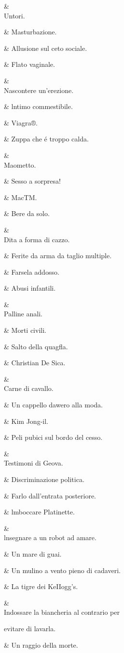 &
\\
Untori.

&
Masturbazione.

&
Allusione sul
ceto sociale.

&
Flato vaginale.

&
\\
Nascontere
un’erezione.

&
lntimo
commestibile.

&
Viagra®.

&
Zuppa che é
troppo calda.

&
\\
Maometto.

&
Sesso a
sorpresa!

&
 MacTM.

&
Bere da solo.

&
\\
Dita a forma di
cazzo.

&
Ferite da
arma da taglio
multiple.

&
Farsela addosso.

&
Abusi infantili.

&
\\
Palline anali.

&
Morti civili.

&
Salto della
quagﬂa.

&
Christian De
Sica.

&
\\
Carne di cavallo.

&
Un cappello
dawero alla
moda.

&
Kim Jong-il.

&
Peli pubici sul
bordo del cesso.

&
\\
Testimoni di
Geova.

&
Discriminazione
politica.

&
Farlo dall’entrata
posteriore.

&
lmboccare
Platinette.

&
\\
lnsegnare a un
robot ad amare.

&
Un mare di guai.

&
Un mulino a
vento pieno di
cadaveri.

&
La tigre dei
KeIIogg’s.

&
\\
Indossare la
biancheria al
contrario per

evitare di lavarla.

&
Un raggio della
morte.


